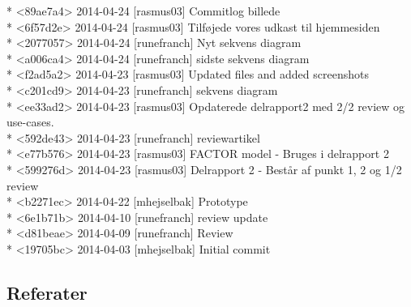 \documentclass[12pt]{article}
\begin{document}
* <89ae7a4> 2014-04-24 [rasmus03]  Commitlog billede \\
* <6f57d2e> 2014-04-24 [rasmus03]  Tilføjede vores udkast til hjemmesiden \\
* <2077057> 2014-04-24 [runefranch]  Nyt sekvens diagram \\
* <a006ca4> 2014-04-24 [runefranch]  sidste sekvens diagram \\ 
* <f2ad5a2> 2014-04-23 [rasmus03]  Updated files and added screenshots \\
* <c201cd9> 2014-04-23 [runefranch]  sekvens diagram \\
* <ee33ad2> 2014-04-23 [rasmus03]  Opdaterede delrapport2 med 2/2 review og use-cases. \\
* <592de43> 2014-04-23 [runefranch]  reviewartikel \\
* <e77b576> 2014-04-23 [rasmus03]  FACTOR model - Bruges i delrapport 2 \\
* <599276d> 2014-04-23 [rasmus03]  Delrapport 2 - Består af punkt 1, 2 og 1/2 review \\
* <b2271ec> 2014-04-22 [mhejselbak]  Prototype \\
* <6e1b71b> 2014-04-10 [runefranch]  review update \\
* <d81beae> 2014-04-09 [runefranch]  Review \\
* <19705bc> 2014-04-03 [mhejselbak]  Initial commit \\
\subsection*{Referater}
\end{document}
